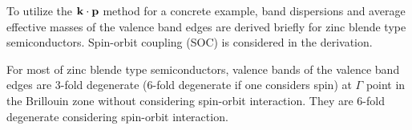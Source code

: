 \documentclass[a4paper, 12pt, titlepage,oneside,drop]{kthesis}
\begin{document}

 
 To utilize the $\bold k \cdot \bold p$ method for a concrete example, band dispersions and average effective masses of the valence band edges are derived briefly for zinc blende type semiconductors.
Spin-orbit coupling (SOC) is considered in the derivation.

For most of zinc blende type semiconductors, valence bands of the valence band edges are 3-fold degenerate (6-fold degenerate if one considers spin) at $\Gamma$ point in the Brillouin zone without considering spin-orbit interaction.
They are 6-fold degenerate considering spin-orbit interaction.
\end{document}
